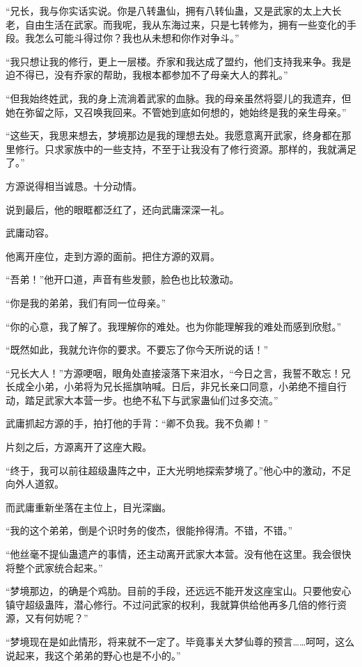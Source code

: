 \begin{this_body}
“兄长，我与你实话实说。你是八转蛊仙，拥有八转仙蛊，又是武家的太上大长老，自由生活在武家。而我呢，我从东海过来，只是七转修为，拥有一些变化的手段。我怎么可能斗得过你？我也从未想和你作对争斗。”

“我只想让我的修行，更上一层楼。乔家和我达成了盟约，他们支持我来争。我是迫不得已，没有乔家的帮助，我根本都参加不了母亲大人的葬礼。”

“但我始终姓武，我的身上流淌着武家的血脉。我的母亲虽然将婴儿的我遗弃，但她在弥留之际，又召唤我回来。不管她到底如何想的，她始终是我的亲生母亲。”

“这些天，我思来想去，梦境那边是我的理想去处。我愿意离开武家，终身都在那里修行。只求家族中的一些支持，不至于让我没有了修行资源。那样的，我就满足了。”

方源说得相当诚恳。十分动情。

说到最后，他的眼眶都泛红了，还向武庸深深一礼。

武庸动容。

他离开座位，走到方源的面前。把住方源的双肩。

“吾弟！”他开口道，声音有些发颤，脸色也比较激动。

“你是我的弟弟，我们有同一位母亲。”

“你的心意，我了解了。我理解你的难处。也为你能理解我的难处而感到欣慰。”

“既然如此，我就允许你的要求。不要忘了你今天所说的话！”

“兄长大人！”方源哽咽，眼角处直接滚落下来泪水，“今日之言，我誓不敢忘！兄长成全小弟，小弟将为兄长摇旗呐喊。日后，非兄长亲口同意，小弟绝不擅自行动，踏足武家大本营一步。也绝不私下与武家蛊仙们过多交流。”

武庸抓起方源的手，拍打他的手背：“卿不负我。我不负卿！”

片刻之后，方源离开了这座大殿。

“终于，我可以前往超级蛊阵之中，正大光明地探索梦境了。”他心中的激动，不足向外人道叙。

而武庸重新坐落在主位上，目光深幽。

“我的这个弟弟，倒是个识时务的俊杰，很能拎得清。不错，不错。”

“他丝毫不提仙蛊遗产的事情，还主动离开武家大本营。没有他在这里。我会很快将整个武家统合起来。”

“梦境那边，的确是个鸡肋。目前的手段，还远远不能开发这座宝山。只要他安心镇守超级蛊阵，潜心修行。不过问武家的权利，我就算供给他再多几倍的修行资源，又有何妨呢？”

“梦境现在是如此情形，将来就不一定了。毕竟事关大梦仙尊的预言……呵呵，这么说起来，我这个弟弟的野心也是不小的。”


\end{this_body}
